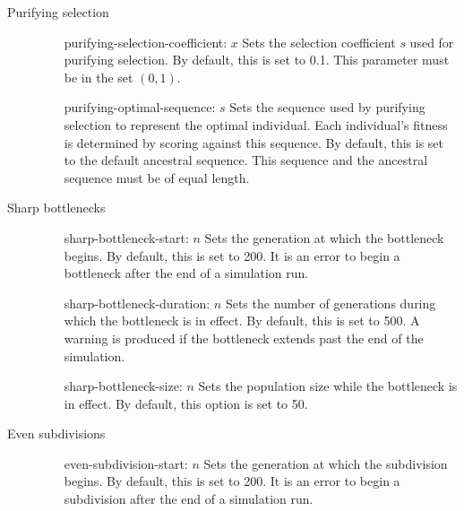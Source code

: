 \documentclass{article}
\begin{document}
        \begin{description}
          \item[Purifying selection]
            \begin{enumerate}
              \item[purifying-selection-coefficient: $x$]
              Sets the selection coefficient $s$ used for purifying selection.
              By default, this is set to 0.1. This parameter must be in the set
              $(0, 1)$.

              \item[purifying-optimal-sequence: $s$]
              Sets the sequence used by purifying selection to represent the
              optimal individual. Each individual's fitness is determined by
              scoring against this sequence. By default, this is set to the
              default ancestral sequence. This sequence and the ancestral
              sequence must be of equal length.
            \end{enumerate}

          \item[Sharp bottlenecks]
            \begin{enumerate}
              \item[sharp-bottleneck-start: $n$]
              Sets the generation at which the bottleneck begins. By default,
              this is set to 200. It is an error to begin a bottleneck after the
              end of a simulation run.

              \item[sharp-bottleneck-duration: $n$]
              Sets the number of generations during which the bottleneck is in
              effect. By default, this is set to 500. A warning is produced if
              the bottleneck extends past the end of the simulation.

              \item[sharp-bottleneck-size: $n$]
              Sets the population size while the bottleneck is in effect. By
              default, this option is set to 50.
            \end{enumerate}

          \item[Even subdivisions]
            \begin{enumerate}
              \item[even-subdivision-start: $n$]
              Sets the generation at which the subdivision begins. By default,
              this is set to 200. It is an error to begin a subdivision after
              the end of a simulation run.


\end{enumerate}
\end{description}
\end{document}
